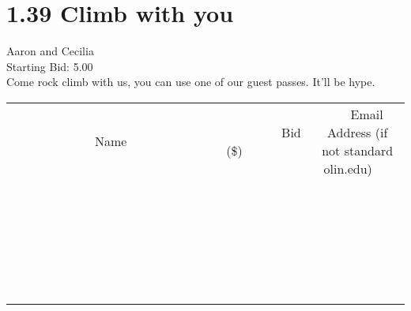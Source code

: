 \documentclass[11pt]{article}
\begin{document}
					\section*{1.39 Climb with you}
					Aaron and Cecilia \\
					Starting Bid: 5.00 \\
					Come rock climb with us, you can use one of our guest passes. It'll be hype. \\
					[6ex]
					\begin{tabular}{c c c}
						~~~~~~~~~~~~~Name~~~~~~~~~~~~~ & ~~~~~~~~~Bid (\$)~~~~~~~~~ & ~~~Email Address (if not standard olin.edu)~~~ \\
				
 & & \\
\hline
 & & \\
\hline
 & & \\
\hline
 & & \\
\hline
 & & \\
\hline
 & & \\
\hline
 & & \\
\hline
 & & \\
\hline
 & & \\
\hline
 & & \\
\hline
 & & \\
\hline
 & & \\
\hline
 & & \\
\hline
 & & \\
\hline
 & & \\
\hline
 & & \\
\hline
 & & \\
\hline
 & & \\
\hline
 & & \\
\hline
 & & \\
\hline
 & & \\
\hline
 & & \\
\hline
 & & \\
\hline
 & & \\
\hline
 & & \\
\hline
 & & \\
\hline
					\end{tabular}
					\clearpage
				
\end{document}
